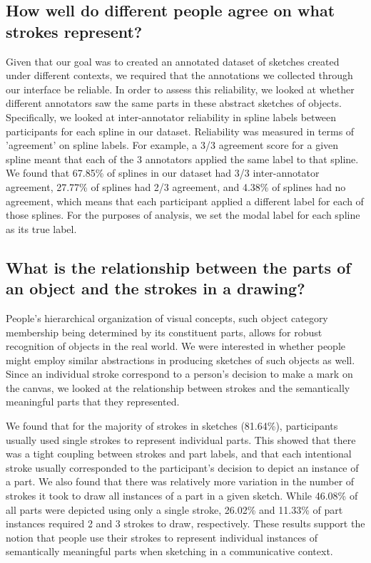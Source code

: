 \documentclass[10pt,letterpaper]{article}
\begin{document}
\subsection{How well do different people agree on what strokes represent?}

Given that our goal was to created an annotated dataset of sketches created under different contexts, we required that the annotations we collected through our interface be reliable. 
In order to assess this reliability, we looked at whether different annotators saw the same parts in these abstract sketches of objects. 
Specifically, we looked at inter-annotator reliability in spline labels between participants for each spline in our dataset. 
Reliability was measured in terms of 'agreement' on spline labels. 
For example, a 3/3 agreement score for a given spline meant that each of the 3 annotators applied the same label to that spline. 
We found that 67.85\% of splines in our dataset had 3/3 inter-annotator agreement, 27.77\% of splines had 2/3 agreement, and 4.38\% of splines had no agreement, which means that each participant applied a different label for each of those splines.
For the purposes of analysis, we set the modal label for each spline as its true label.

\subsection{What is the relationship between the parts of an object and the strokes in a drawing?}



People's hierarchical organization of visual concepts, such object category membership being determined by its constituent parts, allows for robust recognition of objects in the real world. 
We were interested in whether people might employ similar abstractions in producing sketches of such objects as well. 
Since an individual stroke correspond to a person's decision to make a mark on the canvas, we looked at the relationship between strokes and the semantically meaningful parts that they represented.

We found that for the majority of strokes in sketches (81.64\%), participants usually used single strokes to represent individual parts. This showed that there was a tight coupling between strokes and part labels, and that each intentional stroke usually corresponded to the participant's decision to depict an instance of a part.
We also found that there was relatively more variation in the number of strokes it took to draw all instances of a part in a given sketch. While 46.08\% of all parts were depicted using only a single stroke, 26.02\% and 11.33\% of part instances required 2 and 3 strokes to draw, respectively. 
These results support the notion that people use their strokes to represent individual instances of semantically meaningful parts when sketching in a communicative context.
\end{document}

